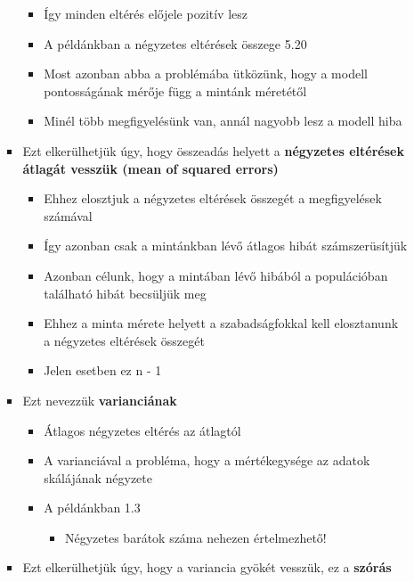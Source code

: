 \documentclass[
  letterpaper,
  DIV=11,
  numbers=noendperiod]{scrreprt}
\providecommand{\tightlist}{%
  \setlength{\itemsep}{0pt}\setlength{\parskip}{0pt}}\usepackage{longtable,booktabs,array}
\begin{document}
\begin{itemize}
\begin{itemize}
\begin{itemize}
      \begin{itemize}
      \item
        Így minden eltérés előjele pozitív lesz
      \item
        A példánkban a négyzetes eltérések összege 5.20
      \item
        Most azonban abba a problémába ütközünk, hogy a modell
        pontosságának mérője függ a mintánk méretétől
      \item
        Minél több megfigyelésünk van, annál nagyobb lesz a modell hiba
      \end{itemize}
    \item
      Ezt elkerülhetjük úgy, hogy összeadás helyett a \textbf{négyzetes
      eltérések átlagát vesszük (mean of squared errors)}

      \begin{itemize}
      \item
        Ehhez elosztjuk a négyzetes eltérések összegét a megfigyelések
        számával
      \item
        Így azonban csak a mintánkban lévő átlagos hibát számszerüsítjük
      \item
        Azonban célunk, hogy a mintában lévő hibából a populációban
        található hibát becsüljük meg
      \item
        Ehhez a minta mérete helyett a szabadságfokkal kell elosztanunk
        a négyzetes eltérések összegét
      \item
        Jelen esetben ez n - 1
      \end{itemize}
    \item
      Ezt nevezzük \textbf{varianciának}

      \begin{itemize}
      \item
        Átlagos négyzetes eltérés az átlagtól
      \item
        A varianciával a probléma, hogy a mértékegysége az adatok
        skálájának négyzete
      \item
        A példánkban 1.3

        \begin{itemize}
        \tightlist
        \item
          Négyzetes barátok száma nehezen értelmezhető!
        \end{itemize}
      \end{itemize}
    \item
      Ezt elkerülhetjük úgy, hogy a variancia gyökét vesszük, ez a
      \textbf{szórás}


\end{itemize}
\end{itemize}
\end{itemize}
\end{document}
